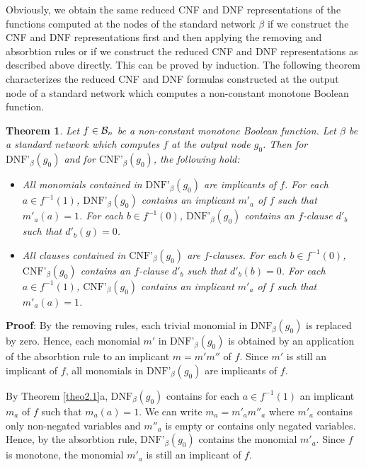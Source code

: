 \documentclass[11pt]{article}
\newtheorem{theo}{Theorem}
\begin{document}
Obviously, we obtain the same reduced CNF and DNF representations of the functions computed at the nodes of the
standard network $\beta$ if we construct the CNF and DNF representations first and then applying the removing and
absorbtion rules or if we construct the reduced CNF and DNF representations as described above directly. This can
be proved by induction.
The following theorem characterizes the reduced CNF and DNF formulas constructed at the output node of a standard
network which computes a non-constant monotone Boolean function.
\begin{theo} \label{theo5.1}
  Let $f \in {\cal B}_n$ be a non-constant monotone Boolean function. Let $\beta$ be a standard network which
  computes $f$ at the output node $g_0$. Then for $\mbox{DNF'}_{\beta}(g_0)$ and for $\mbox{CNF'}_{\beta}(g_0)$,
  the following hold:
  \begin{itemize}
  \item[a)]
    All monomials contained in $\mbox{DNF'}_{\beta}(g_0)$ are implicants of $f$. 
    For each $a \in f^{-1}(1)$, $\mbox{DNF'}_{\beta}(g_0)$ contains an implicant $m'_a$ of $f$ such that
    $m'_a(a) = 1$.
    For each $b \in f^{-1}(0)$, $\mbox{DNF'}_{\beta}(g_0)$ contains an $f$-clause $d'_b$ such that $d'_b(g) = 0$.
  \item[b)]
    All clauses contained in $\mbox{CNF'}_{\beta}(g_0)$ are $f$-clauses.    
    For each $b \in f^{-1}(0)$, $\mbox{CNF'}_{\beta}(g_0)$ contains an $f$-clause $d'_b$ such that $d'_b(b) = 0$.
    For each $a \in f^{-1}(1)$, $\mbox{CNF'}_{\beta}(g_0)$ contains an implicant $m'_a$ of $f$ such that
    $m'_a(a) = 1$.
  \end{itemize}
\end{theo}
{\bf Proof}:
By the removing rules, each trivial monomial in $\mbox{DNF}_{\beta}(g_0)$ is replaced by zero. Hence, each
monomial $m'$ in $\mbox{DNF'}_{\beta}(g_0)$ is obtained by an application of
the absorbtion rule to an implicant $m = m'm''$ of $f$. Since $m'$ is still an implicant of $f$, all monomials
in $\mbox{DNF'}_{\beta}(g_0)$ are implicants of $f$. 
    
By Theorem \ref{theo2.1}a, $\mbox{DNF}_{\beta}(g_0)$ contains for each $a \in f^{-1}(1)$ an implicant $m_a$ of $f$
such that $m_a(a) = 1$. We can write $m_a = m'_am''_a$ where $m'_a$ contains only non-negated variables and
$m''_a$ is empty or contains only negated variables. Hence, by the absorbtion rule, $\mbox{DNF'}_{\beta}(g_0)$
contains the monomial $m'_a$. Since $f$ is monotone, the monomial $m'_a$ is still an implicant of $f$.
\end{document}
